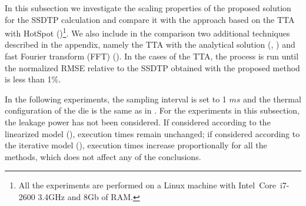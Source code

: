 \begin{table*}
{\begin{tabular}{|r|r|r|r|r|}
      \hline
    \end{tabular}
  }
  \vspace{-10pt}
\end{table*}
In this subsection we investigate the scaling properties of the proposed solution for the SSDTP calculation and compare it with the approach based on the TTA with HotSpot ()\footnote{All the experiments are performed on a Linux machine with Intel\textregistered\ Core\texttrademark\ i7-2600 3.4GHz and 8Gb of RAM.}. We also include in the comparison two additional techniques described in the appendix, namely the TTA with the analytical solution (, ) and fast Fourier transform (FFT) (). In the cases of the TTA, the process is run until the normalized RMSE relative to the SSDTP obtained with the proposed method is less than 1\%.

In the following experiments, the sampling interval is set to 1 $ms$ and the thermal configuration of the die is the same as in . For the experiments in this subsection, the leakage power has not been considered. If considered according to the linearized model (), execution times remain unchanged; if considered according to the iterative model (), execution times increase proportionally for all the methods, which does not affect any of the conclusions.


